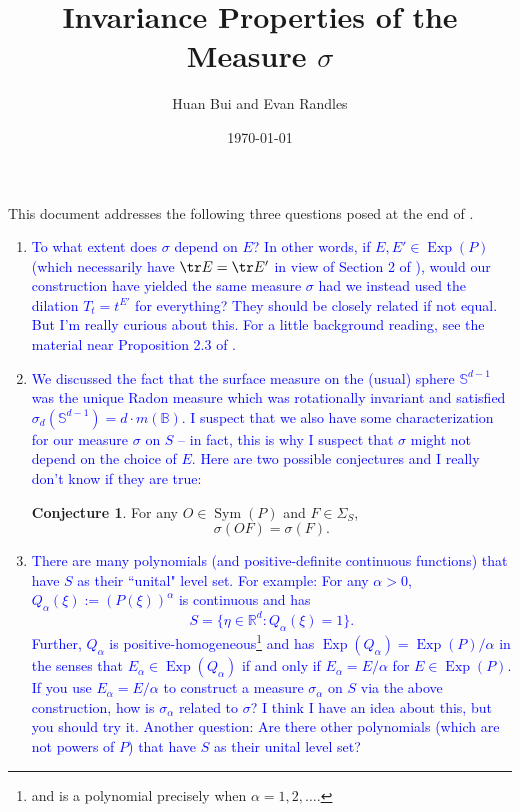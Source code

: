 \documentclass{article}
\author{Huan Bui and Evan Randles}
\title{Invariance Properties of the Measure $\sigma$}
\date{\today}
\theoremstyle{definition}
\newcommand\Sym{\operatorname{Sym}}
\newcommand\Exp{\operatorname{Exp}}
\theoremstyle{theorem}
\newtheorem{conjecture}[theorem]{Conjecture}
\begin{document}
\maketitle

This document addresses the following three questions posed at the end of \cite{RandlesBui2020}.

\begin{framed}


\begin{enumerate}
\item \textcolor{blue}{To what extent does $\sigma$ depend on $E$? In other words, if $E,E'\in\Exp(P)$ (which necessarily have $\tr E=\tr E'$ in view of Section 2 of \cite{Randles2017}), would our construction have yielded the same measure $\sigma$ had we instead used the dilation $T_t=t^{E'}$ for everything? They should be closely related if not equal. But I'm really curious about this. For a little background reading, see the material near Proposition 2.3 of \cite{Randles2017}. }




\item \textcolor{blue}{We discussed the fact that the surface measure on the (usual) sphere $\mathbb{S}^{d-1}$ was the unique Radon measure which was rotationally invariant and satisfied $\sigma_d(\mathbb{S}^{d-1})=d\cdot m(\mathbb{B})$. I suspect that we also have some characterization for our measure $\sigma$ on $S$ -- in fact, this is why I suspect that $\sigma$ might not depend on the choice of $E$. Here are two possible conjectures and I really don't know if they are true:}
\begin{conjecture}{\label{conj:OF_conj}} 
For any $O\in\Sym(P)$ and $F\in\Sigma_S$,
\begin{equation}\label{eq:Conjec1}
\sigma(O F)=\sigma(F).
\end{equation} 
\end{conjecture}


\item \textcolor{blue}{There are many polynomials (and positive-definite continuous functions) that have $S$ as their ``unital" level set. For example: For any $\alpha>0$, $Q_{\alpha}(\xi):=(P(\xi))^\alpha$ is continuous and has
\begin{equation*}
S=\{\eta\in\mathbb{R}^d:Q_{\alpha}(\xi)=1\}.
\end{equation*}
Further, $Q_\alpha$ is positive-homogeneous\footnote{and is a polynomial precisely when $\alpha=1,2,\dots$.} and has $\Exp(Q_{\alpha})=\Exp(P)/\alpha$ in the senses that $E_\alpha\in \Exp(Q_\alpha)$ if and only if $E_\alpha=E/\alpha$ for $E\in \Exp(P)$. If you use $E_{\alpha}=E/\alpha$ to construct a measure $\sigma_\alpha$ on $S$ via the above construction, how is $\sigma_\alpha$ related to $\sigma$? I think I have an idea about this, but you should try it. Another question: Are there other polynomials (which are not powers of $P$) that have $S$ as their unital level set? }
\end{enumerate}

\end{framed}
\end{document}
